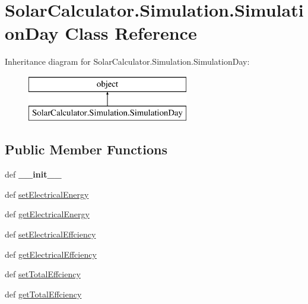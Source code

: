 \hypertarget{class_solar_calculator_1_1_simulation_1_1_simulation_day}{\section{Solar\-Calculator.\-Simulation.\-Simulation\-Day Class Reference}
\label{class_solar_calculator_1_1_simulation_1_1_simulation_day}
}
Inheritance diagram for Solar\-Calculator.\-Simulation.\-Simulation\-Day\-:\begin{figure}[H]
\begin{center}
\leavevmode
\includegraphics[height=2.000000cm]{class_solar_calculator_1_1_simulation_1_1_simulation_day}
\end{center}
\end{figure}
\subsection*{Public Member Functions}
\begin{DoxyCompactItemize}
\item 
\hypertarget{class_solar_calculator_1_1_simulation_1_1_simulation_day_a151cc92597bee98ee501561b985207d5}{def {\bfseries \-\_\-\-\_\-init\-\_\-\-\_\-}}\label{class_solar_calculator_1_1_simulation_1_1_simulation_day_a151cc92597bee98ee501561b985207d5}

\item 
def \hyperlink{class_solar_calculator_1_1_simulation_1_1_simulation_day_adbe2601d4ece12ffc40da2eb636f3ddc}{set\-Electrical\-Energy}
\item 
def \hyperlink{class_solar_calculator_1_1_simulation_1_1_simulation_day_a7671e551a20bfbfba6b501d7cc2fd5ff}{get\-Electrical\-Energy}
\item 
def \hyperlink{class_solar_calculator_1_1_simulation_1_1_simulation_day_ab46c1a422fe5252c126c6714f914f2e9}{set\-Electrical\-Effciency}
\item 
def \hyperlink{class_solar_calculator_1_1_simulation_1_1_simulation_day_a9359770ba4aa0fd15d0261d0ce54dd21}{get\-Electrical\-Effciency}
\item 
def \hyperlink{class_solar_calculator_1_1_simulation_1_1_simulation_day_afd206b559b5b25412b40327f3c833234}{set\-Total\-Effciency}
\item 
def \hyperlink{class_solar_calculator_1_1_simulation_1_1_simulation_day_a8b9ea4c0173a3858a60ba74ce33a0686}{get\-Total\-Effciency}
\end{DoxyCompactItemize}
